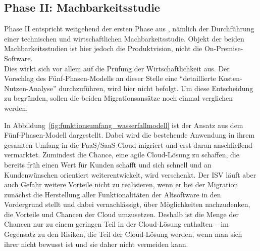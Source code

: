 \begin{comment}
\subsubsection{SWOT-Analyse}
Aus \pcite{}{}{cloud-computing_the_business_perspective}
\begin{description}
	\item[Strengths] \hfill \\
	\begin{itemize}
		\item Skalierbarkeit
		\item 
	\end{itemize}
	\item[Weaknesses] \hfill \\
	\item[Opportunities] \hfill \\
	\item[Threats] \hfill \\
	
\end{description}
\end{comment}



\subsection{Phase II: Machbarkeitsstudie}
Phase II entspricht weitgehend der ersten Phase aus , 
nämlich der Durchführung einer technischen und wirtschaftlichen 
Machbarkeitsstudie. Objekt der beiden Machbarkeitsstudien ist hier jedoch die 
Produktvision, nicht die On-Premise-Software.\\
Dies wirkt sich vor allem auf die Prüfung der Wirtschaftlichkeit aus. Der 
Vorschlag des Fünf-Phasen-Modells an dieser Stelle eine "`detaillierte 
Kosten-Nutzen-Analyse"' durchzuführen, wird hier nicht 
befolgt. Um diese Entscheidung zu begründen, sollen die beiden 
Migrationsansätze noch einmal verglichen werden.


In Abbildung~\ref{fig:funktionsumfang_wasserfallmodell} ist der Ansatz aus dem 
Fünf-Phasen-Modell dargestellt. Dabei wird die bestehende Anwendung in ihrem 
gesamten Umfang in die PaaS/SaaS-Cloud migriert und erst daran anschließend 
vermarktet. Zumindest die Chance, eine agile Cloud-Lösung zu schaffen, die 
bereits früh einen Wert für Kunden schafft und sich schnell und an 
Kundenwünschen orientiert weiterentwickelt, wird verschenkt. Der ISV 
läuft aber auch Gefahr weitere Vorteile nicht zu realisieren, wenn er bei der 
Migration zunächst die Herstellung aller Funktionalitäten der Altsoftware in 
den Vordergrund stellt und dabei vernachlässigt, über Möglichkeiten 
nachzudenken, die Vorteile und Chancen der Cloud umzusetzen. Deshalb ist die 
Menge der Chancen nur zu einem geringen Teil in der Cloud-Lösung enthalten -- 
im Gegensatz zu den Risiken, die Teil der Cloud-Lösung werden, wenn man sich 
ihrer nicht bewusst ist und sie daher nicht vermeiden kann.

